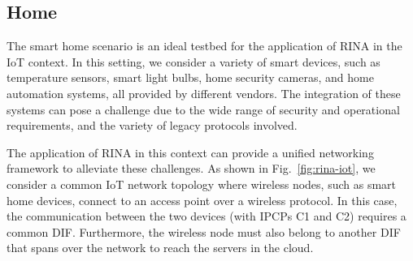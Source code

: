 \documentclass{ieeeaccess}
\begin{document}
\subsection{Home}
%
The smart home scenario is an ideal testbed for the application of RINA in the IoT context. In this setting, we consider a variety of smart devices, such as temperature sensors, smart light bulbs, home security cameras, and home automation systems, all provided by different vendors. The integration of these systems can pose a challenge due to the wide range of security and operational requirements, and the variety of legacy protocols involved.

The application of RINA in this context can provide a unified networking framework to alleviate these challenges. As shown in Fig.~\ref{fig:rina-iot}, we consider a common IoT network topology where wireless nodes, such as smart home devices, connect to an access point over a wireless protocol. In this case, the communication between the two devices (with IPCPs C1 and C2) requires a common DIF. Furthermore, the wireless node must also belong to another DIF that spans over the network to reach the servers in the cloud.
\end{document}
